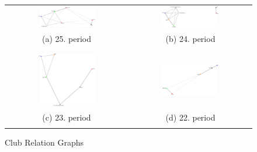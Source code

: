 \begin{figure}
	\center
	\setlength{\tabcolsep}{.26667em}
	\begin{tabular}{ c | c }
		\includegraphics[width=0.48\textwidth]{imgs/graphs/club-graphs/horizontal/graph_25.eps}
		&
		\includegraphics[width=0.48\textwidth]{imgs/graphs/club-graphs/horizontal/graph_24.eps}
		\\
		(a) 25. period
		&
		(b) 24. period
		
		\\
		\\
		\hline
		\\
		\includegraphics[width=0.48\textwidth]{imgs/graphs/club-graphs/horizontal/graph_23.eps}
		&
		\includegraphics[width=0.48\textwidth]{imgs/graphs/club-graphs/horizontal/graph_22.eps}
		\\
		(c) 23. period
		&
		(d) 22. period
		\\
		\\
				
		
	\end{tabular}

	\caption{Club Relation Graphs}
	\label{fig:club_graphs1}
\end{figure}

